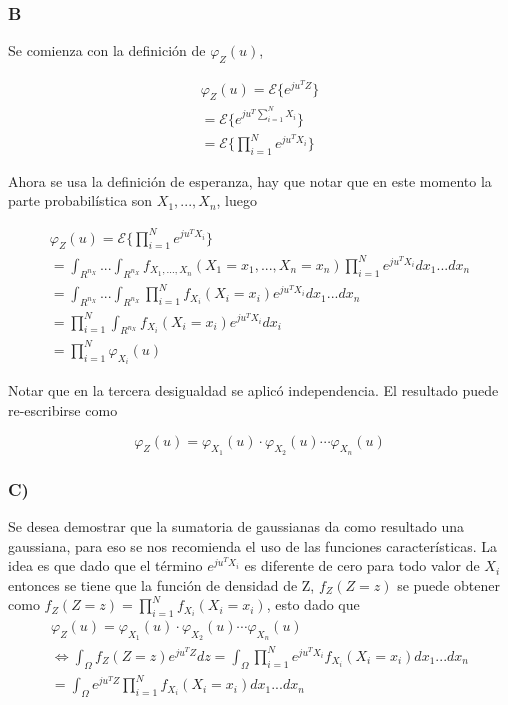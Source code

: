 	\subsubsection{B}
	Se comienza con la definición de $\varphi_{Z}(u)$,

	\begin{eqnarray}
		\varphi_{Z}(u) = \mathcal{E} \lbrace e^{ju^TZ} \rbrace \\
		= \mathcal{E} \lbrace e^{ju^T\sum_{i=1}^NX_i} \rbrace \\
		= \mathcal{E} \lbrace \prod_{i=1}^N e^{ju^TX_i} \rbrace
	\end{eqnarray}

	Ahora se usa la definición de esperanza, hay que notar que en este momento la parte probabilística son $X_1,...,X_n$, luego

	\begin{eqnarray}
		\varphi_{Z}(u) = \mathcal{E} \lbrace \prod_{i=1}^N e^{ju^TX_i} \rbrace\\
		= \int_{R^{n_X}}...\int_{R^{n_X}} f_{X_1,...,X_n}(X_1=x_1,...,X_n=x_n)\prod_{i=1}^N e^{ju^TX_i} dx_1...dx_n \\
		= \int_{R^{n_X}}...\int_{R^{n_X}} \prod_{i=1}^N f_{X_i}(X_i=x_i)e^{ju^TX_i} dx_1...dx_n \\
		= \prod_{i=1}^N \int_{R^{n_X}} f_{X_i}(X_i=x_i)e^{ju^TX_i} dx_i \\
		= \prod_{i=1}^N \varphi_{X_i}(u)
	\end{eqnarray}

	Notar que en la tercera desigualdad se aplicó independencia. El resultado puede re-escribirse como

	\begin{equation}
		\varphi_{Z}(u) = \varphi_{X_1}(u) \cdot \varphi_{X_2}(u)  \cdots  \varphi_{X_n}(u)
	\end{equation}


	\subsubsection{C)}

	Se desea demostrar que la sumatoria de gaussianas da como resultado una gaussiana, para eso se nos recomienda el uso de las funciones características. La idea es que dado que el término $e^{ju^TX_i}$ es diferente de cero para todo valor de $X_i$ entonces se tiene que la función de densidad de Z, $f_Z(Z=z)$ se puede obtener como $f_Z(Z=z) = \prod_{i=1}^Nf_{X_i}(X_i=x_i)$, esto dado que 
	\begin{eqnarray}
		\varphi_{Z}(u) = \varphi_{X_1}(u) \cdot \varphi_{X_2}(u)  \cdots  \varphi_{X_n}(u) \\
		\iff \int_{\Omega} f_Z(Z=z) e^{ju^TZ} dz = \int_{\Omega}\prod_{i=1}^N e^{ju^TX_i} f_{X_i}(X_i=x_i) dx_1...dx_n \\
		=\int_{\Omega} e^{ju^TZ} \prod_{i=1}^N  f_{X_i}(X_i=x_i) dx_1...dx_n
	\end{eqnarray}


